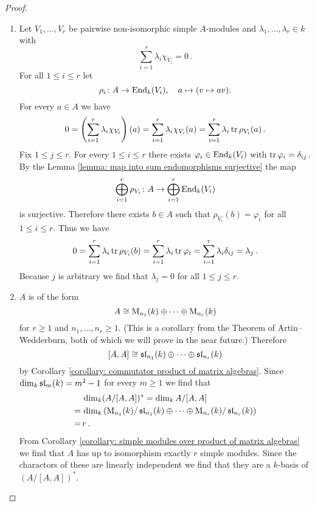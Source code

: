 \begin{proof}
  \begin{enumerate}[label=\emph{\alph*)},leftmargin=*]
    \item
      Let $V_1, \dotsc, V_r$ be pairwise non-isomorphic simple $A$-modules and $\lambda_1, \dotsc, \lambda_r \in k$ with
      \[
          \sum_{i=1}^r \lambda_i \chi_{V_i}
        = 0 \,.
      \]
      For all $1 \leq i \leq r$ let
      \[
                \rho_i
        \colon  A
        \to     \operatorname{End}_k(V_i),
        \quad   a
        \mapsto (v \mapsto av).
      \]
      For every $a \in A$ we have
      \[
          0
        = \left( \sum_{i=1}^r \lambda_i \chi_{V_i} \right)(a)
        = \sum_{i=1}^r \lambda_i \chi_{V_i}(a)
        = \sum_{i=1}^r \lambda_i \operatorname{tr} \rho_{V_i}(a) \,.
      \]
      Fix $1 \leq j \leq r$.
      For every $1 \leq i \leq r$ there exists $\varphi_i \in \operatorname{End}_k(V_i)$ with $\operatorname{tr} \varphi_i = \delta_{ij}$.
      By the Lemma \ref{lemma: map into sum endomorphisms surjective} the map
      \[
                \bigoplus_{i=1}^r \rho_{V_i}
        \colon  A
        \to     \bigoplus_{i=1}^r \operatorname{End}_k(V_i)
      \]
      is surjective.
      Therefore there exists $b \in A$ such that $\rho_{V_i}(b) = \varphi_i$ for all $1 \leq i \leq r$.
      Thus we have
      \[
          0
        = \sum_{i=1}^r \lambda_i \operatorname{tr} \rho_{V_i}(b)
        = \sum_{i=1}^r \lambda_i \operatorname{tr} \varphi_i
        = \sum_{i=1}^r \lambda_i \delta_{ij}
        = \lambda_j \,.
      \]
      Because $j$ is arbitrary we find that $\lambda_j = 0$ for all $1 \leq j \leq r$.
    \item
      $A$ is of the form 
      \[
        A \cong \operatorname{M}_{n_1}(k) \oplus \dotsb \oplus \operatorname{M}_{n_r}(k)
      \]
      for $r \geq 1$ and $n_1, \dotsc, n_r \geq 1$.
      (This is a corollary from the Theorem of Artin--Wedderburn, both of which we will prove in the near future.) Therefore
      \[
        [A,A] \cong \operatorname{\mathfrak{sl}}_{n_1}(k) \oplus \dotsb \oplus \operatorname{\mathfrak{sl}}_{n_r}(k)
      \]
      by Corollary \ref{corollary: commutator product of matrix algebras}.
      Since $\dim_k \operatorname{\mathfrak{sl}}_m(k) = m^2 - 1$ for every $m \geq 1$ we find that
      \begin{align*}
         &\,  \dim_k (A/[A,A])^*
        =     \dim_k A/[A,A] \\
        =&\,  \dim_k\left(
                              \operatorname{M}_{n_1}(k) / \operatorname{\mathfrak{sl}}_{n_1}(k)
                      \oplus  \dotsb
                      \oplus  \operatorname{M}_{n_r}(k) / \operatorname{\mathfrak{sl}}_{n_r}(k)
                    \right) \\
        =&\,  r \,.
      \end{align*}
      From Corollary \ref{corollary: simple modules over product of matrix algebras} we find that $A$ has up to isomorphism exactly $r$ simple modules.
      Since the charactors of these are linearly independent we find that they are a $k$-basis of $(A/[A,A])^*$.
    \qedhere
  \end{enumerate}
\end{proof}


